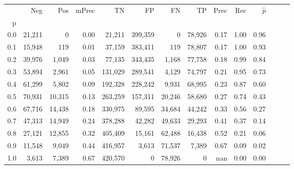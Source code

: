 \begin{tabular}{rrrrrrrrrrrrrr}
\toprule
{} &     Neg &     Pos & mPrec &       TN &       FP &      FN &      TP &  Prec &   Rec & $\hat{p}$ \\
p   &         &         &       &          &          &         &         &       &       &           \\
\midrule
0.0 &  21,211 &       0 &  0.00 &   21,211 &  399,359 &       0 &  78,926 &  0.17 &  1.00 &      0.96 \\
0.1 &  15,948 &     119 &  0.01 &   37,159 &  383,411 &     119 &  78,807 &  0.17 &  1.00 &      0.93 \\
0.2 &  39,976 &   1,049 &  0.03 &   77,135 &  343,435 &   1,168 &  77,758 &  0.18 &  0.99 &      0.84 \\
0.3 &  53,894 &   2,961 &  0.05 &  131,029 &  289,541 &   4,129 &  74,797 &  0.21 &  0.95 &      0.73 \\
0.4 &  61,299 &   5,802 &  0.09 &  192,328 &  228,242 &   9,931 &  68,995 &  0.23 &  0.87 &      0.60 \\
0.5 &  70,931 &  10,315 &  0.13 &  263,259 &  157,311 &  20,246 &  58,680 &  0.27 &  0.74 &      0.43 \\
0.6 &  67,716 &  14,438 &  0.18 &  330,975 &   89,595 &  34,684 &  44,242 &  0.33 &  0.56 &      0.27 \\
0.7 &  47,313 &  14,949 &  0.24 &  378,288 &   42,282 &  49,633 &  29,293 &  0.41 &  0.37 &      0.14 \\
0.8 &  27,121 &  12,855 &  0.32 &  405,409 &   15,161 &  62,488 &  16,438 &  0.52 &  0.21 &      0.06 \\
0.9 &  11,548 &   9,049 &  0.44 &  416,957 &    3,613 &  71,537 &   7,389 &  0.67 &  0.09 &      0.02 \\
1.0 &   3,613 &   7,389 &  0.67 &  420,570 &        0 &  78,926 &       0 &   nan &  0.00 &      0.00 \\
\bottomrule
\end{tabular}

